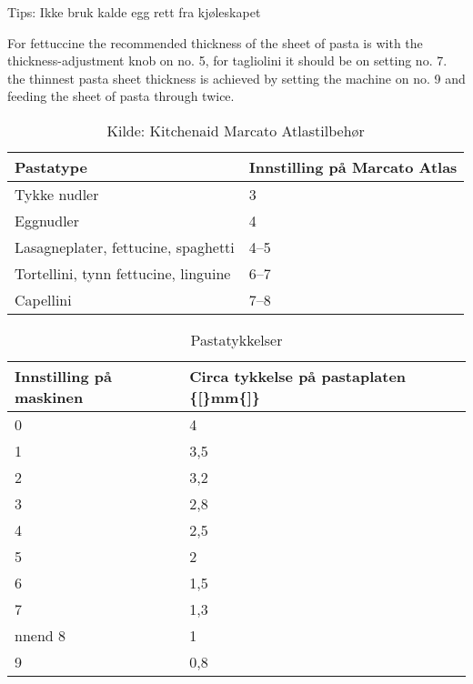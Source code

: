 \documentclass[12pt,a4paper]{book}
\begin{document}
{Tips: Ikke bruk kalde egg rett fra kjøleskapet 

For fettuccine the recommended thickness of the sheet of pasta is with the  thickness-adjustment knob on no. 5, for tagliolini it should
be on setting no. 7.
the thinnest pasta sheet thickness is achieved by setting the machine
on no. 9 and feeding the sheet of pasta through twice.

\begin{table}[]
\centering
\begin{tabular}{ll}
\hline
Pastatype                            & Innstilling på Marcato Atlas \\ \hline
Tykke nudler                         & 3                            \\
Eggnudler                            & 4                            \\
Lasagneplater, fettucine, spaghetti  & 4--5                         \\
Tortellini, tynn fettucine, linguine & 6--7                         \\
Capellini                            & 7--8                         \\ \hline
\end{tabular}
\caption{Kilde: Kitchenaid Marcato Atlastilbehør}
\label{pastatyper}
\end{table}


\begin{table}[]
\centering
\begin{tabular}{ll}
\hline
Innstilling på maskinen & Circa tykkelse på pastaplaten \{{[}\}mm\{{]}\} \\ \hline
0                       & 4                                              \\
1                       & 3,5                                            \\
2                       & 3,2                                            \\
3                       & 2,8                                            \\
4                       & 2,5                                            \\
5                       & 2                                              \\
6                       & 1,5                                            \\
7                       & 1,3                                            \\nnend
8                       & 1                                              \\
9                       & 0,8                                            \\ \hline
\end{tabular}
\caption{Pastatykkelser}
\label{pastatykkelser}
\end{table}

}
\end{document}
